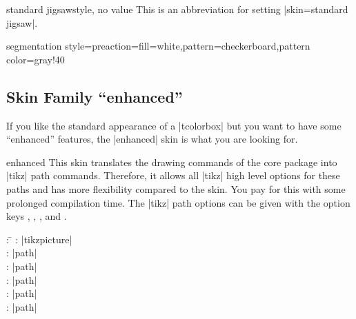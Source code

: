 \begin{docTcbKey}{standard jigsaw}{}{style, no value}
  This is an abbreviation for setting |skin=standard jigsaw|.
\end{docTcbKey}

\begin{dispExample*}{segmentation style={preaction={fill=white},pattern=checkerboard,pattern color=gray!40}}
\end{dispExample*}


\clearpage
\subsection{Skin Family \enquote{enhanced}}
\begin{marker}
If you like the standard appearance of a |tcolorbox| but you want to
have some \enquote{enhanced} features, the |enhanced| skin is what you are looking for.
\end{marker}

\begin{docSkin}{enhanced}
  This skin translates the drawing commands of the core package into |tikz|
  path commands. Therefore, it allows all |tikz| high level options for
  these paths and has more flexibility compared to the  skin.
  You pay for this with some prolonged compilation time.
  The |tikz| path options can
  be given with the option keys
  ,
  ,
  , and
  .
\begin{tcolorbox}[skintable=enhanced]
  \begin{tabbing}
    : \=\kill
    :  \> |tikzpicture|\\ 
    :           \> |path|\\
    : \> |path|\\ 
    :        \> |path|\\
    :    \> |path|\\
    :           \> |path|
  \end{tabbing}
\end{tcolorbox}
\end{docSkin}


